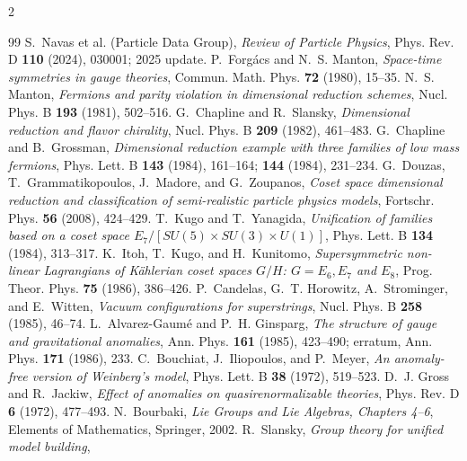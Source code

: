 \documentclass[11pt]{article}
\theoremstyle{remark}
\begin{document}
\clearpage
\begin{multicols}{2}
\begin{thebibliography}{99}
\footnotesize
\setlength{\itemsep}{0pt}
\setlength{\parsep}{0pt}
S.~Navas et al. (Particle Data Group),
\emph{Review of Particle Physics},
Phys. Rev. D \textbf{110} (2024), 030001; 2025 update.
P.~Forg\'acs and N.~S. Manton,
\emph{Space-time symmetries in gauge theories},
Commun. Math. Phys. \textbf{72} (1980), 15--35.
N.~S. Manton,
\emph{Fermions and parity violation in dimensional reduction schemes},
Nucl. Phys. B \textbf{193} (1981), 502--516.
G.~Chapline and R.~Slansky,
\emph{Dimensional reduction and flavor chirality},
Nucl. Phys. B \textbf{209} (1982), 461--483.
G.~Chapline and B.~Grossman,
\emph{Dimensional reduction example with three families of low mass fermions},
Phys. Lett. B \textbf{143} (1984), 161--164;
\textbf{144} (1984), 231--234.
G.~Douzas, T.~Grammatikopoulos, J.~Madore, and G.~Zoupanos,
\emph{Coset space dimensional reduction and classification of semi-realistic
particle physics models},
Fortschr. Phys. \textbf{56} (2008), 424--429.
T.~Kugo and T.~Yanagida,
\emph{Unification of families based on a coset space
\(E_7/[SU(5)\times SU(3)\times U(1)]\)},
Phys. Lett. B \textbf{134} (1984), 313--317.
K.~Itoh, T.~Kugo, and H.~Kunitomo,
\emph{Supersymmetric non-linear Lagrangians of K\"ahlerian coset spaces
\(G/H\): \(G=E_6,E_7\) and \(E_8\)},
Prog. Theor. Phys. \textbf{75} (1986), 386--426.
P.~Candelas, G.~T. Horowitz, A.~Strominger, and E.~Witten,
\emph{Vacuum configurations for superstrings},
Nucl. Phys. B \textbf{258} (1985), 46--74.
L.~Alvarez-Gaum\'e and P.~H. Ginsparg,
\emph{The structure of gauge and gravitational anomalies},
Ann. Phys. \textbf{161} (1985), 423--490;
erratum, Ann. Phys. \textbf{171} (1986), 233.
C.~Bouchiat, J.~Iliopoulos, and P.~Meyer,
\emph{An anomaly-free version of Weinberg's model},
Phys. Lett. B \textbf{38} (1972), 519--523.
D.~J. Gross and R.~Jackiw,
\emph{Effect of anomalies on quasirenormalizable theories},
Phys. Rev. D \textbf{6} (1972), 477--493.
N.~Bourbaki,
\emph{Lie Groups and Lie Algebras, Chapters 4--6},
Elements of Mathematics, Springer, 2002.
R.~Slansky, \emph{Group theory for unified model building},

\end{thebibliography}
\end{multicols}
\end{document}
